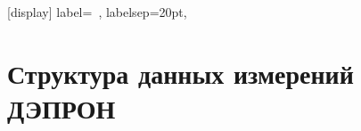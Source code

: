 \appendix
\sectionformat{\chapter}[display]{%
    label=\chaptertitlename\ \thechapter,%
    labelsep=20pt,
}
\renewcommand\thechapter{\Asbuk{chapter}} %



\chapter{Структура данных измерений ДЭПРОН} \label{AppendixA}



